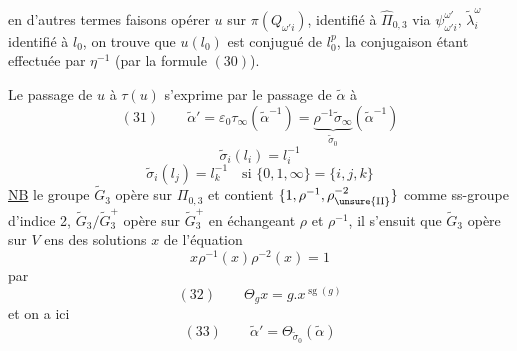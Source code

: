 en d'autres termes faisons opérer $u$ sur $\pi(Q_{\omega'i})$, identifié à $\widehat\Pi_{0,3}$ via $\psi_{\omega'i}^{\omega'}$, $\widetilde\lambda_i^\omega$ identifié à $l_0$, on trouve que $u(l_0)$ est conjugué de $l_0^p$,  la conjugaison étant effectuée par $\eta^{-1}$ (par la formule $(30)$).

Le passage de $u$ à $\tau(u)$ s'exprime par
le passage de $\widetilde\alpha$ à
\[
(31)\qquad\widetilde\alpha'=\varepsilon_0\tau_\infty(\widetilde\alpha^{-1})
=\underbrace{\rho^{-1}\widetilde\sigma_\infty}_{\widetilde\sigma_0}(\widetilde\alpha^{-1})
\]
\[
\widetilde\sigma_i(l_i)=l_i^{-1}
\]
\[
\widetilde\sigma_i(l_j)=l_k^{-1}\quad\text{si }\{0,1,\infty\}=\{i,j,k\}
\]
\uline{NB} le groupe $\widetilde G_3$ opère sur $\Pi_{0,3}$ et contient \deleted{$\unsure{\xi}$}  $\{1,\rho^{-1},\rho_{\unsure{\mathrm{II}}}^{-2}\}$ comme ss-groupe  d'indice 2,  $\widetilde G_3/\widetilde G_3^+$ opère sur $\widetilde G_3^+$ en échangeant $\rho$ et $\rho^{-1}$, il s'ensuit que $\widetilde G_3$ opère sur $V$ ens des solutions $x$ de l'équation
\[
x\rho^{-1}(x)\rho^{-2}(x)=1
\]
par
\[
(32)\qquad\Theta_g x=g.x^{\operatorname{sg}(g)}
\]
et on a ici
\[
(33)\qquad\widetilde\alpha'=\Theta_{\widetilde\sigma_0}(\widetilde\alpha)
\]
